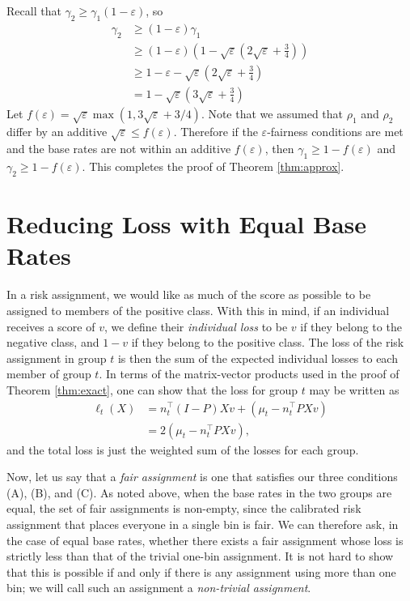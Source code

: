 \documentclass[11pt]{article}
\def\tran{^{\top}}
\newcommand{\p}[1]{\left(#1\right)}
\begin{document}
Recall that $\gamma_2 \ge \gamma_1 (1-\varepsilon)$, so
\begin{align*}
  \gamma_2 &\ge (1-\varepsilon) \gamma_1 \\
  &\ge (1-\varepsilon)\p{1-\sqrt{\varepsilon} \p{2 \sqrt{\varepsilon} +
  \frac{3}{4}}} \\
  &\ge 1 - \varepsilon - \sqrt{\varepsilon} \p{2 \sqrt{\varepsilon} +
  \frac{3}{4}} \\
  &= 1 - \sqrt{\varepsilon} \p{3\sqrt{\varepsilon} + \frac{3}{4}}
\end{align*}
Let $f(\varepsilon) = \sqrt{\varepsilon} \max(1,
3\sqrt{\varepsilon} + 3/4)$. Note that we assumed that $\rho_1$ and $\rho_2$
differ by an additive $\sqrt{\varepsilon} \le f(\varepsilon)$. Therefore if the
$\varepsilon$-fairness conditions are met and the base rates are not within an
additive $f(\varepsilon)$, then $\gamma_1 \ge 1-f(\varepsilon)$ and $\gamma_2
\ge 1-f(\varepsilon)$. This completes the proof of Theorem \ref{thm:approx}.



\section{Reducing Loss with Equal Base Rates}

In a risk assignment, we would like as much of the score as possible
to be assigned to members of the positive class.
With this in mind, if an individual receives a score of $v$, we
define their {\em individual loss} to be $v$ if they belong
to the negative class, and $1 - v$ if they belong to the positive class.
The loss of the risk assignment in group $t$ is then the sum of the 
expected individual losses to each member of group $t$.
In terms of the matrix-vector products used in the proof 
of Theorem \ref{thm:exact}, one can show that the loss for group $t$ 
may be written as
\begin{align*}
  \ell_t(X) &= n_t\tran (I-P)Xv + (\mu_t - n_t\tran PXv) \\
  &= 2(\mu_t - n_t\tran PXv),
\end{align*}
and the total loss is just the weighted sum of the losses for each group.

Now, let us say that a 
{\em fair assignment} is one that satisfies our three conditions
(A), (B), and (C).  
As noted above, 
when the base rates in the two groups are equal, 
the set of fair assignments is non-empty, 
since the calibrated risk assignment that places
everyone in a single bin is fair.
We can therefore ask, in the case of equal base rates, whether
there exists a fair assignment whose loss is strictly less than 
that of the trivial one-bin assignment.
It is not hard to show that this is possible if and only if there
is any assignment using more than one bin; we will call such an
assignment a {\em non-trivial assignment}.
\end{document}
